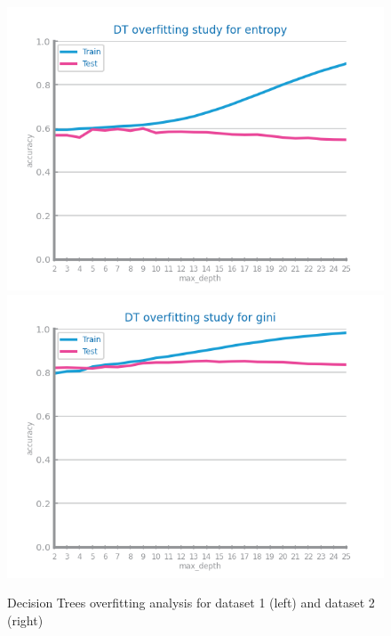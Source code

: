 \documentclass[10pt]{extarticle}
\begin{document}
\begin{figure}[H]
\centering\includegraphics[scale=0.95]{images/dataset1/models_evaluation/CovidPos_dt_accuracy_overfitting.png}
\includegraphics[scale=0.95]{images/dataset2/models_evaluation/Credit_Score_DT_overfitting.png}
\caption{Decision Trees overfitting analysis for dataset 1 (left) and dataset 2 (right)}
\end{figure}
\end{document}
